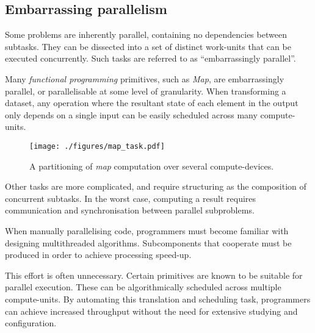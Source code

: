 \subsection{Embarrassing parallelism}
Some problems are inherently parallel, containing no dependencies between subtasks. They can be dissected into a set of distinct work-units that can be executed concurrently.
Such tasks are referred to as ``embarrassingly parallel''.

Many \emph{functional programming} primitives, such as \emph{Map}, are embarrassingly parallel, or parallelisable at some level of granularity.
When transforming a dataset, any operation where the resultant state of each element in the output only depends on a single input can be easily scheduled across many compute-units.

\begin{figure}[h]
  \texttt{[image: ./figures/map\_task.pdf]}
  \caption{A partitioning of \emph{map} computation over several compute-devices.}
  \label{fig:map_task}
\end{figure}

Other tasks are more complicated, and require structuring as the composition of concurrent subtasks.
In the worst case, computing a result requires communication and synchronisation between parallel subproblems.

When manually parallelising code, programmers must become familiar with designing multithreaded algorithms. Subcomponents that cooperate must be produced in order to achieve processing speed-up.

This effort is often unnecessary. Certain primitives are known to be suitable for parallel execution. These can be algorithmically scheduled across multiple compute-units. By automating this translation and scheduling task, programmers can achieve increased throughput without the need for extensive studying and configuration.


